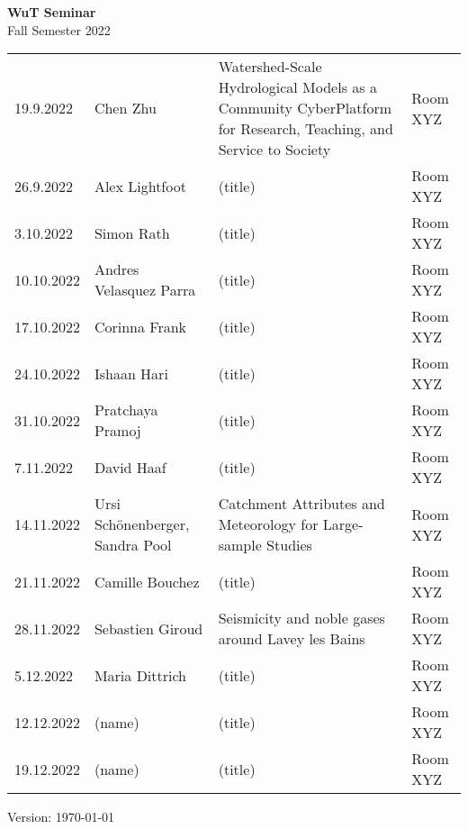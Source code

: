 \documentclass[12pt]{article}
\begin{document}
\centering

{\Huge \bf WuT Seminar}\\[1cm]
{\Large Fall Semester 2022}\\[1.8cm]





\renewcommand*\arraystretch{1.4}
\begin{tabular}{l p{3.8cm} p{8.5cm} p{2cm}}

19.9.2022
 	& Chen Zhu
 	& Watershed-Scale Hydrological Models as a Community CyberPlatform for Research, Teaching, and Service to Society
  & Room XYZ\\
  
26.9.2022
 	& Alex Lightfoot
 	& (title)
 	& Room XYZ\\

3.10.2022
 	& Simon Rath
 	& (title)
 	& Room XYZ\\

10.10.2022
 	& Andres Velasquez Parra
 	& (title)
 	& Room XYZ\\

17.10.2022
 	& Corinna Frank
 	& (title)
 	& Room XYZ\\
 	
24.10.2022
 	& Ishaan Hari
 	& (title)
 	& Room XYZ\\

31.10.2022
 	& Pratchaya Pramoj
 	& (title)
 	& Room XYZ\\

7.11.2022
 	& David Haaf
 	& (title)
 	& Room XYZ\\

14.11.2022
 	& Ursi Schönenberger, Sandra Pool
 	& Catchment Attributes and Meteorology for Large-sample Studies
 	& Room XYZ\\

21.11.2022
 	& Camille Bouchez
 	& (title)
 	& Room XYZ\\

28.11.2022
 	& Sebastien Giroud
 	& Seismicity and noble gases around Lavey les Bains
 	& Room XYZ\\

5.12.2022
 	& Maria Dittrich
 	& (title)
 	& Room XYZ\\

12.12.2022
 	& (name)
 	& (title)
 	& Room XYZ\\

19.12.2022
 	& (name)
 	& (title)
 	& Room XYZ\\


\end{tabular}

\vfill

{\scriptsize Version: \today}
\end{document}
